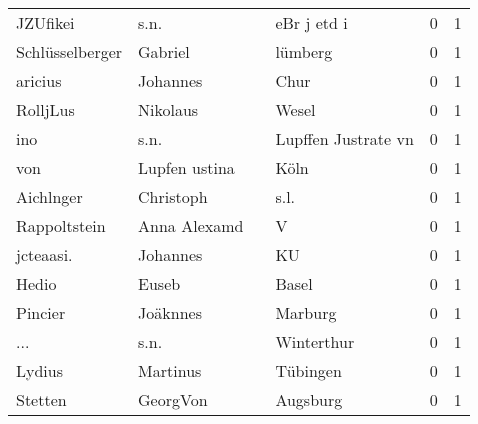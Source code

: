 \begin{tabular}{llllrr}
                 JZUfikei &                               s.n. &             &                                 eBr j etd i &          0 &         1 \\
          Schlüsselberger &                            Gabriel &             &                                     lümberg &          0 &         1 \\
                  aricius &                           Johannes &             &                                        Chur &          0 &         1 \\
                 RolljLus &                           Nikolaus &             &                                       Wesel &          0 &         1 \\
                      ino &                               s.n. &             &                         Lupffen Justrate vn &          0 &         1 \\
                      von &                      Lupfen ustina &             &                                        Köln &          0 &         1 \\
                Aichlnger &                          Christoph &             &                                        s.l. &          0 &         1 \\
             Rappoltstein &                       Anna Alexamd &             &                                           V &          0 &         1 \\
                jcteaasi. &                           Johannes &             &                                          KU &          0 &         1 \\
                    Hedio &                              Euseb &             &                                       Basel &          0 &         1 \\
                  Pincier &                           Joäknnes &             &                                     Marburg &          0 &         1 \\
                      ... &                               s.n. &             &                                  Winterthur &          0 &         1 \\
                   Lydius &                           Martinus &             &                                    Tübingen &          0 &         1 \\
                  Stetten &                           GeorgVon &             &                                    Augsburg &          0 &         1 \\

\end{tabular}

